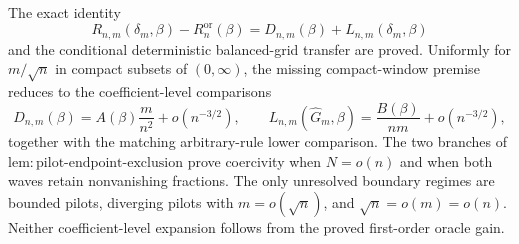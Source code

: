 The exact identity
\[
R_{n,m}(\delta_m,\beta)-R_n^{\mathrm{or}}(\beta)
=D_{n,m}(\beta)+L_{n,m}(\delta_m,\beta)
\]
and the conditional deterministic balanced-grid transfer are proved.  Uniformly for \(m/\sqrt n\) in compact subsets of \((0,\infty)\), the missing compact-window premise reduces to the coefficient-level comparisons
\[
D_{n,m}(\beta)
=A(\beta)\frac{m}{n^2}+o(n^{-3/2}),
\qquad
L_{n,m}(\widehat G_m,\beta)
=\frac{B(\beta)}{nm}+o(n^{-3/2}),
\]
together with the matching arbitrary-rule lower comparison.  The two branches of \(\mathrm{lem{:}pilot\text{-}endpoint\text{-}exclusion}\) prove coercivity when \(N=o(n)\) and when both waves retain nonvanishing fractions.  The only unresolved boundary regimes are bounded pilots, diverging pilots with \(m=o(\sqrt n)\), and \(\sqrt n=o(m)=o(n)\).  Neither coefficient-level expansion follows from the proved first-order oracle gain.
